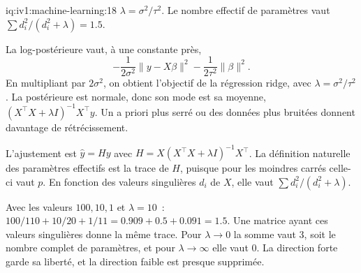\begin{solution}{iq:iv1:machine-learning:18}
$\lambda = \sigma^2/\tau^2$. Le nombre effectif de paramètres vaut $\sum d_i^2/(d_i^2 + \lambda) = 1.5$.

La log-postérieure vaut, à une constante près,
\[
-\frac{1}{2\sigma^2}\|y - X\beta\|^2 - \frac{1}{2\tau^2}\|\beta\|^2.
\]
En multipliant par $2\sigma^2$, on obtient l'objectif de la régression ridge, avec $\lambda = \sigma^2/\tau^2$. La postérieure est normale, donc son mode est sa moyenne, $(X^\top X + \lambda I)^{-1}X^\top y$. Un a priori plus serré ou des données plus bruitées donnent davantage de rétrécissement.

L'ajustement est $\hat{y} = Hy$ avec $H = X(X^\top X + \lambda I)^{-1}X^\top$. La définition naturelle des paramètres effectifs est la trace de $H$, puisque pour les moindres carrés celle-ci vaut $p$. En fonction des valeurs singulières $d_i$ de $X$, elle vaut $\sum d_i^2/(d_i^2 + \lambda)$.

Avec les valeurs $100, 10, 1$ et $\lambda = 10$~: $100/110 + 10/20 + 1/11 = 0.909 + 0.5 + 0.091 = 1.5$. Une matrice ayant ces valeurs singulières donne la même trace. Pour $\lambda \to 0$ la somme vaut 3, soit le nombre complet de paramètres, et pour $\lambda \to \infty$ elle vaut 0. La direction forte garde sa liberté, et la direction faible est presque supprimée.



\end{solution}

